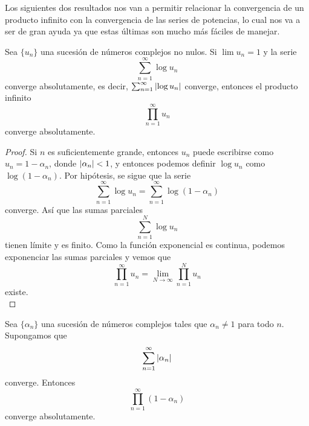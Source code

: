 \medskip

Los siguientes dos resultados nos van a permitir relacionar la convergencia de un producto infinito con la convergencia de las series de potencias, lo cual nos va a ser de gran ayuda ya que estas últimas son mucho más fáciles de manejar. \\

\begin{prop}
    Sea $\{u_n\}$ una sucesión de números complejos no nulos. Si $\lim u_n =1$ y la serie
    \begin{equation*}
        \sum_{n=1}^{\infty} \log u_n
    \end{equation*}
    converge absolutamente, es decir, $ \sum_{n=1}^{\infty} \left\lvert\log u_n\right\rvert$ converge, entonces el producto infinito
    \begin{equation*}
        \prod_{n=1}^{\infty} u_n
    \end{equation*}
    converge absolutamente.
\end{prop}

\begin{proof}
    Si $n$ es suficientemente grande, entonces $u_n$ puede escribirse como $u_n = 1 - \alpha_n$, donde $\left\lvert\alpha_n\right\rvert < 1$, y entonces podemos definir $\log{u_n}$ como $\log{(1 - \alpha_n)}$. Por hipótesis, se sigue que la serie
    \begin{equation*}
        \sum_{n=1}^{\infty} \log u_n = \sum_{n=1}^{\infty} \log{(1 - \alpha_n)}
    \end{equation*}
    converge. Así que las sumas parciales
    \begin{equation*}
        \sum_{n=1}^{N} \log u_n
    \end{equation*}
    tienen límite y es finito. Como la función exponencial es continua, podemos exponenciar las sumas parciales y vemos que
    \begin{equation*}
        \prod_{n=1}^{\infty} u_n = \lim_{N \to \infty} \prod_{n=1}^{N} u_n
    \end{equation*}
    existe. \\
\end{proof}

\begin{prop}
    \label{th:convergencia}
    Sea $\{\alpha_n\}$ una sucesión de números complejos tales que $\alpha_n \not = 1$ para todo $n$. Supongamos que
    \begin{equation*}
        \sum_{n=1}^{\infty} \left\lvert\alpha_n\right\rvert
    \end{equation*}
    converge. Entonces
    \begin{equation*}
        \prod_{n=1}^{\infty} (1 - \alpha_n)
    \end{equation*}
    converge absolutamente.
\end{prop}

